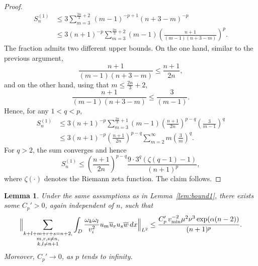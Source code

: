 \documentclass[a4paper,reqno,twoside]{amsart}
\numberwithin{equation}{section}
\newtheorem{lemma}[theorem]{Lemma}
\theoremstyle{definition}
\newcommand{\<}{\ensuremath \leq}
\renewcommand{\>}{\ensuremath \geq}
\begin{document}
\begin{proof}
\begin{equation}
\begin{aligned}
            S_n^{(1)} &\leq 3 \sum_{m=3}^{\frac{2n}{3}+2} \, (m-1)^{-p+1} (n+3-m)^{-p} \\
            &\leq 3 (n+1)^{-p} \sum_{m=3}^{\frac{2n}{3}+2}
            (m-1)\left( \frac{n+1}{(m-1)(n+3-m)} \right)^{p}.
        \end{aligned}
    \end{equation}
    The fraction admits two different upper bounds. On the one hand, similar to the previous argument,
    \begin{equation}
        \frac{n+1}{(m-1)(n+3-m)} \leq \frac{n+1}{2n},
    \end{equation}
    and on the other hand, using that $m \leq \frac{2n}{3}+2$,
    \begin{equation}
        \frac{n+1}{(m-1)(n+3-m)} \leq \frac{3}{(m-1)}.
    \end{equation}
    Hence, for any $1 < q < p$,
    \begin{equation}
        \begin{aligned}
            S_n^{(1)} &\leq 3 (n+1)^{-p} \sum_{m=3}^{\frac{2n}{3}+1}(m-1)
              \left( \frac{n+1}{2n} \right)^{p-q} \left( \frac{3}{m-1} \right)^{q} \\
            &\leq 3 (n+1)^{-p} \left(\frac{n+1}{2n}\right)^{p-q} \sum_{m=2}^{\infty} m\left( \frac{3}{m} \right)^{q}.
        \end{aligned}
    \end{equation}
    For $q > 2$, the sum converges and hence
    \begin{equation}
        S_n^{(1)} \leq \left(\frac{n+1}{2n}\right)^{p-q}\frac{9 \cdot 3^q (\zeta(q-1) - 1)}{ \, (n+1)^p},
    \end{equation}
    where $\zeta(\cdot)$ denotes the Riemann zeta function. The claim follows.
\end{proof}


\begin{lemma}\label{lem:bound2}
    Under the same assumptions as in Lemma~\ref{lem:bound1}, there exists some $C_p' > 0$,
    again independent of $n$, such that
    \begin{equation}
        \Bigl\lVert \sum_{\substack{k+l+m+r+s = n+2, \\ m, r, s \neq n, \\ k, l \neq n+1}}
        \int_D \frac{\omega_k \omega_l}{v_i^2} u_m \overline{u}_r u_s \overline{w} \, dx
        \Bigr\rVert_{L^2}
        \leq \frac{C_p' \, v_{\min}^{-2} \mu^2 \nu^3 \exp(\alpha(n-2))}{(n+1)^p}.
    \end{equation}
    Moreover, $C_p'\rightarrow0$, as $p$ tends to infinity.
\end{lemma}
\end{document}
